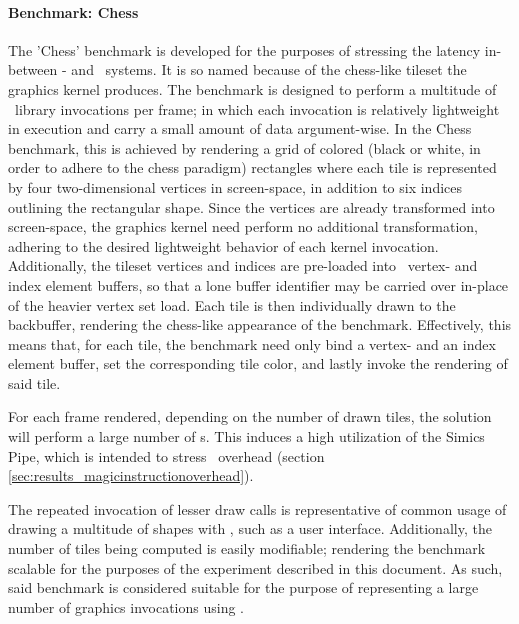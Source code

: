 


\paragraph{Benchmark: Chess}
\label{par:experimentalmethodology_benchmarking_benchmarkchess}
The 'Chess' benchmark is developed for the purposes of stressing the latency in-between \dvttermtarget - and \dvttermhost\ systems.
It is so named because of the chess-like tileset the graphics kernel produces.
The benchmark is designed to perform a multitude of \dvttermopenglestwopointo\ library invocations per frame; in which each invocation is relatively lightweight in execution and carry a small amount of data argument-wise.
In the Chess benchmark, this is achieved by rendering a grid of colored (black or white, in order to adhere to the chess paradigm) rectangles where each tile is represented by four two-dimensional vertices in screen-space, in addition to six indices outlining the rectangular shape.
Since the vertices are already transformed into screen-space, the graphics kernel need perform no additional transformation, adhering to the desired lightweight behavior of each kernel invocation.
Additionally, the tileset vertices and indices are pre-loaded into \dvttermopengl\ vertex- and index element buffers, so that a lone buffer identifier may be carried over in-place of the heavier vertex set load.
Each tile is then individually drawn to the backbuffer, rendering the chess-like appearance of the benchmark.
Effectively, this means that, for each tile, the benchmark need only bind a vertex- and an index element buffer, set the corresponding tile color, and lastly invoke the rendering of said tile.

For each frame rendered, depending on the number of drawn tiles, the solution will perform a large number of \dvttermmagicinstruction s.
This induces a high utilization of the Simics Pipe, which is intended to stress \dvttermmagicinstruction\ overhead (section \ref{sec:results_magicinstructionoverhead}).

The repeated invocation of lesser draw calls is representative of common usage of drawing a multitude of shapes with \dvttermopengl , such as a user interface. Additionally, the number of tiles being computed is easily modifiable; rendering the benchmark scalable for the purposes of the experiment described in this document. As such, said benchmark is considered suitable for the purpose of representing a large number of graphics invocations using \dvttermopenglestwopointo .

